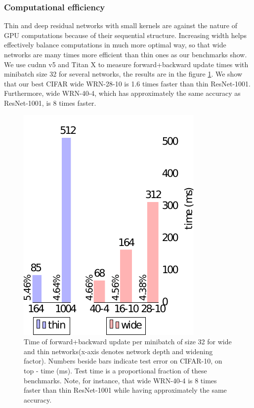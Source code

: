 \documentclass{bmvc2k}
\begin{document}
\subsubsection*{Computational efficiency} Thin and deep residual networks with small kernels are against the nature of GPU computations because of their sequential structure. Increasing width helps effectively balance computations in much more optimal way, so that wide networks are many times more efficient than thin ones as our benchmarks show. We use cudnn v5 and Titan X to measure forward+backward update times with minibatch size 32 for several networks, the results are in the figure \ref{fig:benchmark}. We show that our best CIFAR wide WRN-28-10 is 1.6 times faster than thin ResNet-1001. Furthermore, wide WRN-40-4, which has  approximately the same accuracy as ResNet-1001, is 8 times faster.

\begin{figure}[h]
  \centering
  \includegraphics[scale=0.6]{./images/benchmark-edited.pdf}
  \caption{Time of forward+backward update per minibatch of size 32 for wide and thin networks(x-axis denotes network depth and widening factor). Numbers beside bars indicate test error on CIFAR-10, on top - time (ms). Test time is a proportional fraction of these benchmarks. Note, for instance, that wide WRN-40-4 is 8 times faster than thin ResNet-1001 while having approximately the same accuracy.
}
  \vspace{-0.2cm}
  \label{fig:benchmark}
\end{figure}
\end{document}
